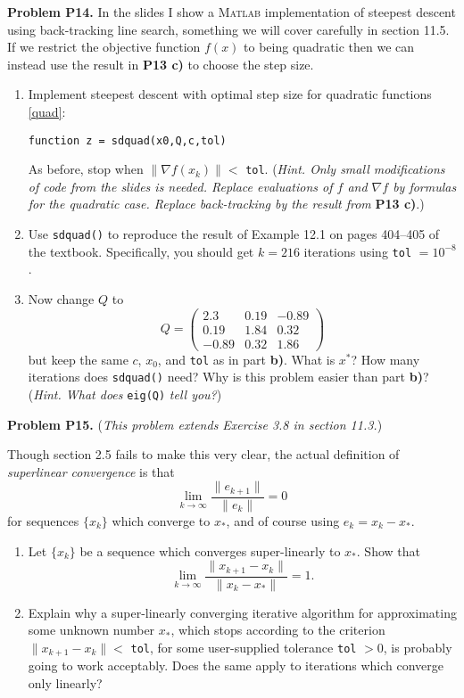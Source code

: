 \documentclass[12pt]{amsart}
\newcommand{\grad}{\nabla}
\newcommand{\Matlab}{\textsc{Matlab}\xspace}
\newcommand{\prob}[1]{\bigskip\noindent\textbf{#1}\quad }
\begin{document}
\medskip
\prob{Problem P14.}  In the slides I show a \Matlab implementation of steepest descent using back-tracking line search, something we will cover carefully in section 11.5.  If we restrict the objective function $f(x)$ to being quadratic then we can instead use the result in \textbf{P13 c)} to choose the step size.
\begin{enumerate}
\item Implement steepest descent with optimal step size for quadratic functions \eqref{quad}:

\centerline{\texttt{function z = sdquad(x0,Q,c,tol)}}

\noindent As before, stop when $\|\grad f(x_k)\| < $ \texttt{tol}.  (\emph{Hint.  Only small modifications of code from the slides is needed.  Replace evaluations of $f$ and $\grad f$ by formulas for the quadratic case.  Replace back-tracking by the result from }\textbf{P13 c)}.)
\item Use \texttt{sdquad()} to reproduce the result of Example 12.1 on pages 404--405 of the textbook.  Specifically, you should get $k=216$ iterations using \texttt{tol} $=10^{-8}$.
\item Now change $Q$ to
    $$Q = \begin{pmatrix}
    2.3   &  0.19 & -0.89 \\
    0.19  &  1.84 &  0.32 \\
    -0.89 &  0.32 &  1.86
    \end{pmatrix}$$
but keep the same $c$, $x_0$, and \texttt{tol} as in part \textbf{b)}.  What is $x^*$?  How many iterations does \texttt{sdquad()} need?  Why is this problem easier than part \textbf{b)}?  (\emph{Hint.  What does} \texttt{eig(Q)} \emph{tell you?})
\end{enumerate}

\medskip
\prob{Problem P15.}  (\emph{This problem extends Exercise 3.8 in section 11.3.})

Though section 2.5 fails to make this very clear, the actual definition of \emph{superlinear convergence} is that
    $$\lim_{k\to\infty} \frac{\|e_{k+1}\|}{\|e_k\|} = 0$$
for sequences $\{x_k\}$ which converge to $x_*$, and of course using $e_k = x_k - x_*$.

\begin{enumerate}
\item Let $\{x_k\}$ be a sequence which converges super-linearly to $x_*$.  Show that
    $$\lim_{k\to\infty} \frac{\|x_{k+1} - x_k\|}{\|x_k - x_*\|} = 1.$$
\item Explain why a super-linearly converging iterative algorithm for approximating some unknown number $x_*$, which stops according to the criterion $\|x_{k+1} - x_k\| < $ \texttt{tol}, for some user-supplied tolerance \texttt{tol} $ > 0$, is probably going to work acceptably.  Does the same apply to iterations which converge only linearly? 
\end{enumerate}
\end{document}
